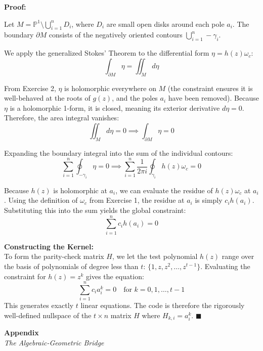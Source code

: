 \documentclass[11pt]{article}
\begin{document}
	\begin{mdframed}[backgroundcolor=gray!5, linecolor=gray!50, linewidth=1pt]
		\textbf{Proof:}
		
		Let $M = \mathbb{P}^1 \setminus \bigcup_{i=1}^n D_i$, where $D_i$ are small open disks around each pole $a_i$. The boundary $\partial M$ consists of the negatively oriented contours $\bigcup_{i=1}^n -\gamma_i$.
		
		We apply the generalized Stokes' Theorem to the differential form $\eta = h(z)\omega_c$:
		$$ \int_{\partial M} \eta = \iint_M d\eta $$
		
		From Exercise 2, $\eta$ is holomorphic everywhere on $M$ (the constraint ensures it is well-behaved at the roots of $g(z)$, and the poles $a_i$ have been removed). Because $\eta$ is a holomorphic 1-form, it is closed, meaning its exterior derivative $d\eta = 0$. Therefore, the area integral vanishes:
		$$ \iint_M d\eta = 0 \implies \int_{\partial M} \eta = 0 $$
		
		Expanding the boundary integral into the sum of the individual contours:
		$$ \sum_{i=1}^n \oint_{-\gamma_i} \eta = 0 \implies \sum_{i=1}^n \frac{1}{2\pi i} \oint_{\gamma_i} h(z)\omega_c = 0 $$
		
		Because $h(z)$ is holomorphic at $a_i$, we can evaluate the residue of $h(z)\omega_c$ at $a_i$. Using the definition of $\omega_c$ from Exercise 1, the residue at $a_i$ is simply $c_i h(a_i)$. Substituting this into the sum yields the global constraint:
		$$ \sum_{i=1}^n c_i h(a_i) = 0 $$
		
		\textbf{Constructing the Kernel:} \\
		To form the parity-check matrix $H$, we let the test polynomial $h(z)$ range over the basis of polynomials of degree less than $t$: $\{1, z, z^2, \dots, z^{t-1}\}$. 
		Evaluating the constraint for $h(z) = z^k$ gives the equation:
		$$ \sum_{i=1}^n c_i a_i^k = 0 \quad \text{for } k = 0, 1, \dots, t-1 $$
		This generates exactly $t$ linear equations. The code is therefore the rigorously well-defined nullspace of the $t \times n$ matrix $H$ where $H_{k,i} = a_i^k$. \hfill $\blacksquare$
	\end{mdframed}

	\newpage
	\begin{center}
		{\Huge \textbf{Appendix}} \\
		\vspace{0.3cm}
		{\Large \textit{The Algebraic-Geometric Bridge}}
	\end{center}
	
\end{document}
